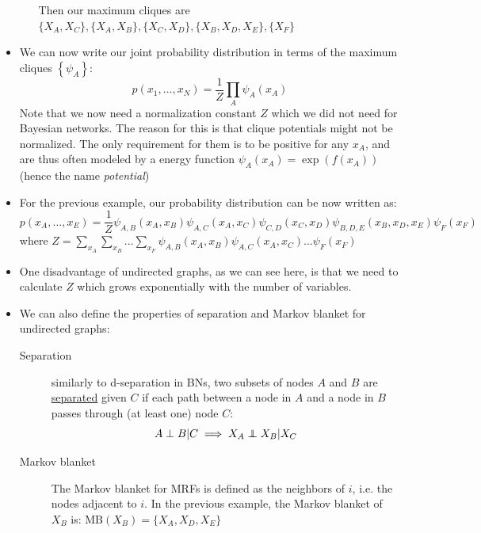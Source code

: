 \begin{itemize}
\begin{itemize}
		Then our maximum cliques are $\{X_A,X_C\}, \{X_A, X_B\}, \{X_C,X_D\},\{X_B,X_D,X_E\},\{X_F\}$
	\end{itemize}
	\item We can now write our joint probability distribution in terms of the maximum cliques $\left\{\psi_A\right\}$:$$p(x_1,...,x_N)=\frac{1}{Z}\prod_A \psi_A(x_A)$$
	Note that we now need a normalization constant $Z$ which we did not need for Bayesian networks. The reason for this is that clique potentials might not be normalized. The only requirement for them is to be positive for any $x_A$, and are thus often modeled by a energy function $\psi_A(x_A) = \exp(f(x_A))$ (hence the name \textit{potential})
	\item For the previous example, our probability distribution can be now written as:
	$$p(x_A,...,x_E)=\frac{1}{Z}\psi_{A,B}(x_A,x_B)\psi_{A,C}(x_A,x_C)\psi_{C,D}(x_C,x_D)\psi_{B,D,E}(x_B,x_D,x_E)\psi_{F}(x_F)$$
	where $Z=\sum_{x_A}\sum_{x_B}...\sum_{x_F}\psi_{A,B}(x_A,x_B)\psi_{A,C}(x_A,x_C)...\psi_{F}(x_F)$
	\item One disadvantage of undirected graphs, as we can see here, is that we need to calculate $Z$ which grows exponentially with the number of variables.
	\item We can also define the properties of separation and Markov blanket for undirected graphs:
	\begin{description}
		\item[Separation] similarly to d-separation in BNs, two subsets of nodes $A$ and $B$ are \underline{separated} given $C$ if each path between a node in $A$ and a node in $B$ passes through (at least one) node $C$:
		$$A\perp B|C\implies X_A\independent X_B|X_C$$
		\item[Markov blanket] The Markov blanket for MRFs is defined as the neighbors of $i$, i.e. the nodes adjacent to $i$. In the previous example, the Markov blanket of $X_B$ is: $\text{MB}(X_B) = \{X_A,X_D,X_E\}$
	\end{description}
\end{itemize}
